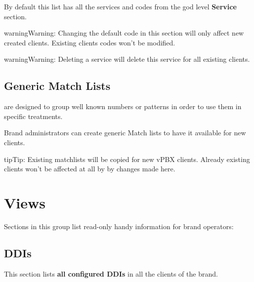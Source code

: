 \documentclass[letterpaper,10pt,english]{sphinxmanual}
\begin{document}
By default this list has all the services and codes from the god level \textbf{Service} section.

\begin{notice}{warning}{Warning:}
Changing the default code in this section will only affect new created clients. Existing clients codes won't
be modified.
\end{notice}

\begin{notice}{warning}{Warning:}
Deleting a service will delete this service for all existing clients.
\end{notice}


\subsection{Generic Match Lists}
\label{administration_portal/brand/settings/generic_match_lists:generic-match-lists}\label{administration_portal/brand/settings/generic_match_lists::doc}\label{administration_portal/brand/settings/generic_match_lists:brand-match-lists}
{\hyperref[administration_portal/client/vpbx/routing_tools/match_lists:match\string-lists]{}} are designed to group well known numbers or patterns in order to use them in specific treatments.

Brand administrators can create generic Match lists to have it available for new clients.

\begin{notice}{tip}{Tip:}
Existing matchlists will be copied for new vPBX clients. Already existing clients won't be affected at all by
by changes made here.
\end{notice}


\section{Views}
\label{administration_portal/brand/views/index::doc}\label{administration_portal/brand/views/index:views}
Sections in this group list read-only handy information for brand operators:


\subsection{DDIs}
\label{administration_portal/brand/views/ddis:ddis}\label{administration_portal/brand/views/ddis::doc}
This section lists \textbf{all configured DDIs} in all the clients of the brand.
\end{document}
